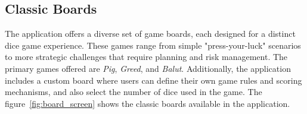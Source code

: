 \subsection{Classic Boards}

The application offers a diverse set of game boards, each designed for a distinct dice game experience. These games range from simple "press-your-luck" scenarios to more strategic challenges that require planning and risk management. The primary games offered are \textit{Pig}, \textit{Greed}, and \textit{Balut}. Additionally, the application includes a custom board where users can define their own game rules and scoring mechanisms, and also select the number of dice used in the game. The figure~\ref{fig:board_screen} shows the classic boards available in the application.

\begin{figure}[h]
    \centering
    \begin{subfigure}[b]{0.27\textwidth}

\end{subfigure}
\end{figure}
